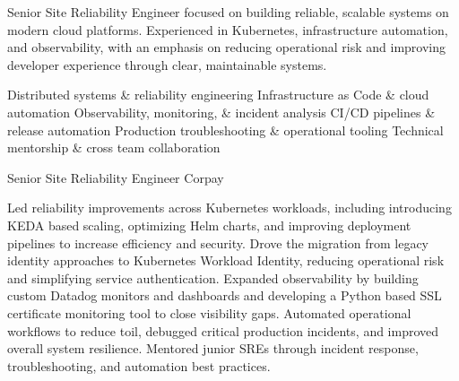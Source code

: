 \documentclass[a4paper]{ReadableCV}
\begin{document}


\showHeader



Senior Site Reliability Engineer focused on building reliable, scalable systems on modern cloud platforms. Experienced in Kubernetes, infrastructure automation, and observability, with an emphasis on reducing operational risk and improving developer experience through clear, maintainable systems.

\bigskip


\addSkills
{Distributed systems \& reliability engineering}
{Infrastructure as Code \& cloud automation}
{Observability, monitoring, \& incident analysis}
{CI/CD pipelines \& release automation}
{Production troubleshooting \& operational tooling}
{Technical mentorship \& cross team collaboration}
{}{}{}

\bigskip



{Senior Site Reliability Engineer}
{Corpay}

\roleAchievements
{Led reliability improvements across Kubernetes workloads, including introducing KEDA based scaling, optimizing Helm charts, and improving deployment pipelines to increase efficiency and security.}
{Drove the migration from legacy identity approaches to Kubernetes Workload Identity, reducing operational risk and simplifying service authentication.}
{Expanded observability by building custom Datadog monitors and dashboards and developing a Python based SSL certificate monitoring tool to close visibility gaps.}
{Automated operational workflows to reduce toil, debugged critical production incidents, and improved overall system resilience.}
{Mentored junior SREs through incident response, troubleshooting, and automation best practices.}
{}{}{}{}
\end{document}
